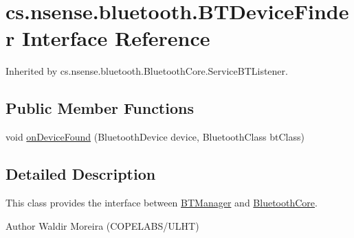 \hypertarget{interfacecs_1_1nsense_1_1bluetooth_1_1_b_t_device_finder}{\section{cs.\-nsense.\-bluetooth.\-B\-T\-Device\-Finder Interface Reference}
\label{interfacecs_1_1nsense_1_1bluetooth_1_1_b_t_device_finder}
}


Inherited by cs.\-nsense.\-bluetooth.\-Bluetooth\-Core.\-Service\-B\-T\-Listener.

\subsection*{Public Member Functions}
\begin{DoxyCompactItemize}
\item 
void \hyperlink{interfacecs_1_1nsense_1_1bluetooth_1_1_b_t_device_finder_a125df9a719ba4cc5db472ae66342a0cc}{on\-Device\-Found} (Bluetooth\-Device device, Bluetooth\-Class bt\-Class)
\end{DoxyCompactItemize}


\subsection{Detailed Description}
This class provides the interface between \hyperlink{classcs_1_1nsense_1_1bluetooth_1_1_b_t_manager}{B\-T\-Manager} and \hyperlink{classcs_1_1nsense_1_1bluetooth_1_1_bluetooth_core}{Bluetooth\-Core}. \begin{DoxyAuthor}{Author}
Waldir Moreira (C\-O\-P\-E\-L\-A\-B\-S/\-U\-L\-H\-T) 
\end{DoxyAuthor}


